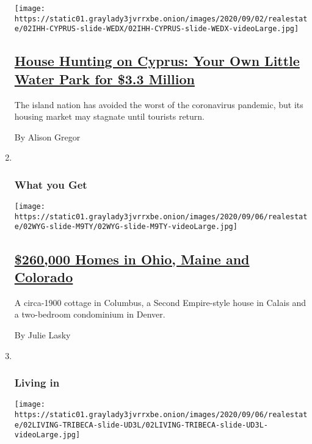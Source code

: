 \begin{enumerate}
  \texttt{[image: https://static01.graylady3jvrrxbe.onion/images/2020/09/02/realestate/02IHH-CYPRUS-slide-WEDX/02IHH-CYPRUS-slide-WEDX-videoLarge.jpg]}

  \hypertarget{house-hunting-on-cyprus-your-own-little-water-park-for-33-million}{%
  \subsection{\texorpdfstring{\href{/2020/09/02/realestate/cyprus-real-estate.html}{House
  Hunting on Cyprus: Your Own Little Water Park for \$3.3
  Million}}{House Hunting on Cyprus: Your Own Little Water Park for \$3.3 Million}}\label{house-hunting-on-cyprus-your-own-little-water-park-for-33-million}}

  The island nation has avoided the worst of the coronavirus pandemic,
  but its housing market may stagnate until tourists return.

  By Alison Gregor
\item ~
  \hypertarget{what-you-get}{%
  \subsubsection{What you Get}\label{what-you-get}}

  \texttt{[image: https://static01.graylady3jvrrxbe.onion/images/2020/09/06/realestate/02WYG-slide-M9TY/02WYG-slide-M9TY-videoLarge.jpg]}

  \hypertarget{260000-homes-in-ohio-maine-and-colorado}{%
  \subsection{\texorpdfstring{\href{/2020/09/02/realestate/260000-homes-in-ohio-maine-and-colorado.html}{\$260,000
  Homes in Ohio, Maine and
  Colorado}}{\$260,000 Homes in Ohio, Maine and Colorado}}\label{260000-homes-in-ohio-maine-and-colorado}}

  A circa-1900 cottage in Columbus, a Second Empire-style house in
  Calais and a two-bedroom condominium in Denver.

  By Julie Lasky
\item ~
  \hypertarget{living-in}{%
  \subsubsection{Living in}\label{living-in}}

  \texttt{[image: https://static01.graylady3jvrrxbe.onion/images/2020/09/06/realestate/02LIVING-TRIBECA-slide-UD3L/02LIVING-TRIBECA-slide-UD3L-videoLarge.jpg]}


\end{enumerate}

